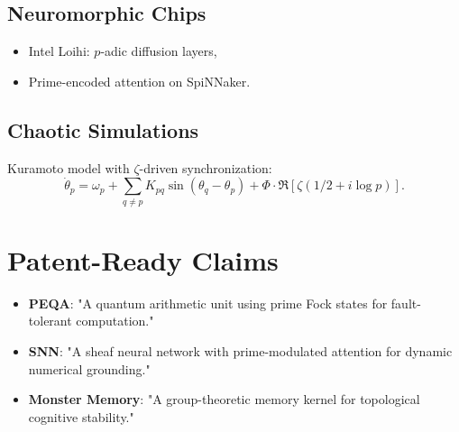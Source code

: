 \documentclass{article}
\theoremstyle{plain}
\begin{document}
\subsection{Neuromorphic Chips}
\begin{itemize}
    \item Intel Loihi: $p$-adic diffusion layers,
    \item Prime-encoded attention on SpiNNaker.
\end{itemize}

\subsection{Chaotic Simulations}
Kuramoto model with $\zeta$-driven synchronization:
\[
\dot{\theta}_p = \omega_p + \sum_{q \neq p} K_{pq} \sin(\theta_q - \theta_p) + \Phi \cdot \Re[\zeta(1/2 + i \log p)].
\]

\section{Patent-Ready Claims}
\begin{itemize}
    \item \textbf{PEQA}: "A quantum arithmetic unit using prime Fock states for fault-tolerant computation."
    \item \textbf{SNN}: "A sheaf neural network with prime-modulated attention for dynamic numerical grounding."
    \item \textbf{Monster Memory}: "A group-theoretic memory kernel for topological cognitive stability."
\end{itemize}
\end{document}
